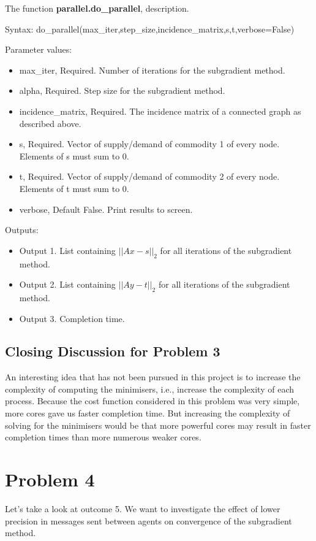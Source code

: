 \documentclass[12pt]{article}
\begin{document}
The function \textbf{parallel.do\_parallel}, description.

Syntax: do\_parallel(max\_iter,step\_size,incidence\_matrix,s,t,verbose=False)

Parameter values:
\begin{itemize}
	\item max\_iter, Required. Number of iterations for the subgradient method.
	\item alpha, Required. Step size for the subgradient method.
	\item incidence\_matrix, Required. The incidence matrix of a connected graph as described above.
	\item s, Required. Vector of supply/demand of commodity 1 of every node. Elements of s must sum to 0.
	\item t, Required. Vector of supply/demand of commodity 2 of every node. Elements of t must sum to 0.
	\item verbose, Default False. Print results to screen.
\end{itemize}

Outputs:
\begin{itemize}
	\item Output 1. List containing $||Ax-s||_2$ for all iterations of the subgradient method.
	\item Output 2. List containing $||Ay-t||_2$ for all iterations of the subgradient method.
	\item Output 3. Completion time.
\end{itemize}

\subsection*{Closing Discussion for Problem 3}

An interesting idea that has not been pursued in this project is to increase the complexity of computing the minimisers, i.e., increase the complexity of each process. Because the cost function considered in this problem was very simple, more cores gave us faster completion time. But increasing the complexity of solving for the minimisers would be that more powerful cores may result in faster completion times than more numerous weaker cores.

\section*{Problem 4}

Let's take a look at outcome 5. We want to investigate the effect of lower precision in messages sent between agents on convergence of the subgradient method.
\end{document}
